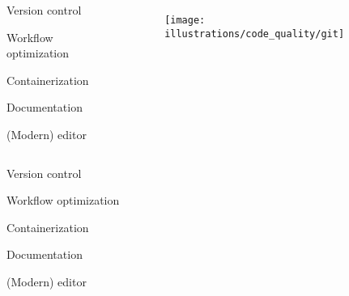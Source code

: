 \documentclass[usenames,dvipsnames]{beamer}
\theoremstyle{plain}
\theoremstyle{definition}
\begin{document}
\begin{frame}{\setframetitle{}}
  
  \begin{columns}[t]
    
    \begin{itemize}
      \item Version control 
      \textcolor{bg!85!normal text.fg}
      {\item Workflow optimization     
      \item Containerization  
      \item Documentation
      \item (Modern) editor}
      
    \end{itemize}
    
    \begin{figure}
      \captionsetup[subfigure]{justification=centering}
      \centering
      \subcaptionbox{}
      {\texttt{[image: illustrations/code\_quality/git]}}
    \end{figure}
  \end{columns}
  
\end{frame}




\begin{frame}{\setframetitle{}}
  
  \begin{columns}[t]
    
    \begin{itemize}
      \item \textcolor{bg!85!normal text.fg}{Version control}
      \item Workflow optimization     
      \textcolor{bg!85!normal text.fg}
      {\item Containerization  
      \item Documentation
      \item (Modern) editor} 
    \end{itemize}
    
    \begin{figure}
      \centering
      {}
    \end{figure}
  \end{columns}
  
\end{frame}
\end{document}
